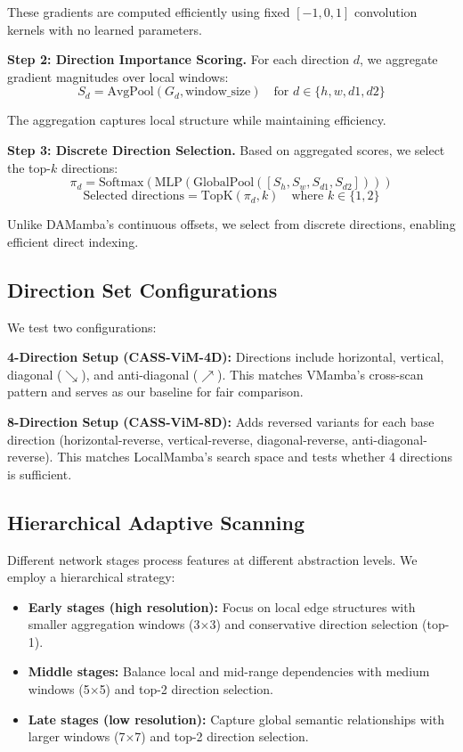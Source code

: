 \documentclass{article}
\begin{document}
These gradients are computed efficiently using fixed $[-1, 0, 1]$ convolution kernels with no learned parameters.

\textbf{Step 2: Direction Importance Scoring.} For each direction $d$, we aggregate gradient magnitudes over local windows:
\begin{equation}
S_d = \text{AvgPool}(G_d, \text{window\_size}) \quad \text{for } d \in \{h, w, d1, d2\}
\end{equation}

The aggregation captures local structure while maintaining efficiency.

\textbf{Step 3: Discrete Direction Selection.} Based on aggregated scores, we select the top-$k$ directions:
\begin{equation}
\pi_d = \text{Softmax}(\text{MLP}(\text{GlobalPool}([S_h, S_w, S_{d1}, S_{d2}])))
\end{equation}
\begin{equation}
\text{Selected directions} = \text{TopK}(\pi_d, k) \quad \text{where } k \in \{1, 2\}
\end{equation}

Unlike DAMamba's continuous offsets, we select from discrete directions, enabling efficient direct indexing.

\subsection{Direction Set Configurations}

We test two configurations:

\textbf{4-Direction Setup (CASS-ViM-4D):} Directions include horizontal, vertical, diagonal ($\searrow$), and anti-diagonal ($\nearrow$). This matches VMamba's cross-scan pattern and serves as our baseline for fair comparison.

\textbf{8-Direction Setup (CASS-ViM-8D):} Adds reversed variants for each base direction (horizontal-reverse, vertical-reverse, diagonal-reverse, anti-diagonal-reverse). This matches LocalMamba's search space and tests whether 4 directions is sufficient.

\subsection{Hierarchical Adaptive Scanning}

Different network stages process features at different abstraction levels. We employ a hierarchical strategy:

\begin{itemize}
    \item \textbf{Early stages (high resolution):} Focus on local edge structures with smaller aggregation windows (3$\times$3) and conservative direction selection (top-1).
    \item \textbf{Middle stages:} Balance local and mid-range dependencies with medium windows (5$\times$5) and top-2 direction selection.
    \item \textbf{Late stages (low resolution):} Capture global semantic relationships with larger windows (7$\times$7) and top-2 direction selection.
\end{itemize}
\end{document}
